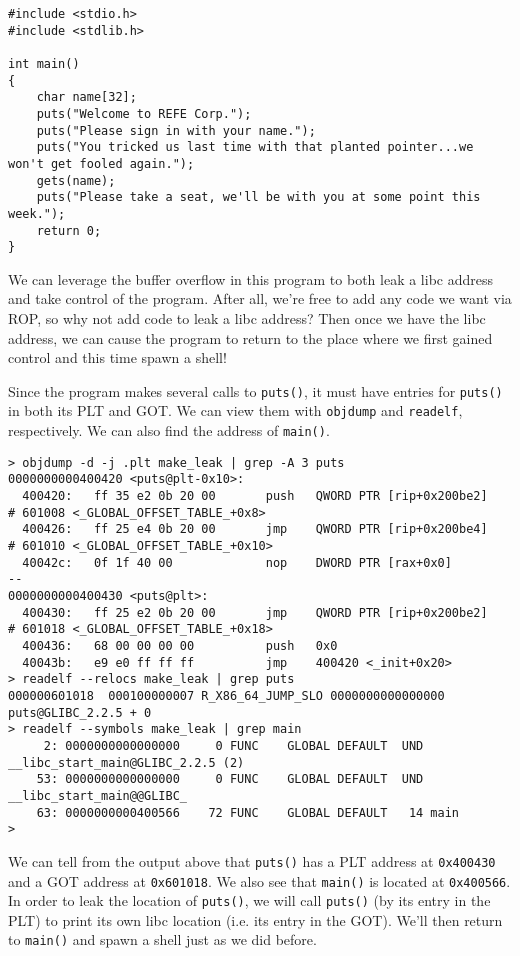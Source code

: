 \documentclass{article}
\begin{document}
\begin{lstlisting}
#include <stdio.h>
#include <stdlib.h>

int main()
{
	char name[32];
	puts("Welcome to REFE Corp.");
	puts("Please sign in with your name.");
	puts("You tricked us last time with that planted pointer...we won't get fooled again.");
	gets(name);
	puts("Please take a seat, we'll be with you at some point this week.");
	return 0;
}
\end{lstlisting}

We can leverage the buffer overflow in this program to both leak a libc address
and take control of the program. After all, we're free to add any code we want
via ROP, so why not add code to leak a libc address? Then once we have the libc
address, we can cause the program to return to the place where we first gained
control and this time spawn a shell!

Since the program makes several calls to \texttt{puts()}, it must have entries
for \texttt{puts()} in both its PLT and GOT. We can view them with
\texttt{objdump} and \texttt{readelf}, respectively. We can also find the
address of \texttt{main()}.

\begin{lstlisting}
> objdump -d -j .plt make_leak | grep -A 3 puts
0000000000400420 <puts@plt-0x10>:
  400420:	ff 35 e2 0b 20 00    	push   QWORD PTR [rip+0x200be2]        # 601008 <_GLOBAL_OFFSET_TABLE_+0x8>
  400426:	ff 25 e4 0b 20 00    	jmp    QWORD PTR [rip+0x200be4]        # 601010 <_GLOBAL_OFFSET_TABLE_+0x10>
  40042c:	0f 1f 40 00          	nop    DWORD PTR [rax+0x0]
--
0000000000400430 <puts@plt>:
  400430:	ff 25 e2 0b 20 00    	jmp    QWORD PTR [rip+0x200be2]        # 601018 <_GLOBAL_OFFSET_TABLE_+0x18>
  400436:	68 00 00 00 00       	push   0x0
  40043b:	e9 e0 ff ff ff       	jmp    400420 <_init+0x20>
> readelf --relocs make_leak | grep puts
000000601018  000100000007 R_X86_64_JUMP_SLO 0000000000000000 puts@GLIBC_2.2.5 + 0
> readelf --symbols make_leak | grep main
     2: 0000000000000000     0 FUNC    GLOBAL DEFAULT  UND __libc_start_main@GLIBC_2.2.5 (2)
    53: 0000000000000000     0 FUNC    GLOBAL DEFAULT  UND __libc_start_main@@GLIBC_
    63: 0000000000400566    72 FUNC    GLOBAL DEFAULT   14 main
> 
\end{lstlisting}

We can tell from the output above that \texttt{puts()} has a PLT address at
\texttt{0x400430} and a GOT address at \texttt{0x601018}. We also see that
\texttt{main()} is located at \texttt{0x400566}. In order to leak the location
of \texttt{puts()}, we will call \texttt{puts()} (by its entry in the PLT) to
print its own libc location (i.e. its entry in the GOT). We'll then return to
\texttt{main()} and spawn a shell just as we did before.
\end{document}
